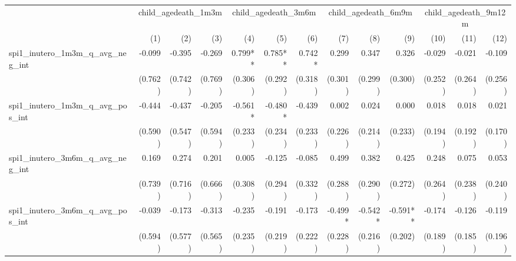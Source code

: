 \begin{tabular}{lrrrrrrrrrrrr}
\toprule
                                            &  \multicolumn{3}{c}{child\_agedeath\_1m3m} &  \multicolumn{3}{c}{child\_agedeath\_3m6m} &  \multicolumn{3}{c}{child\_agedeath\_6m9m} & \multicolumn{3}{c}{child\_agedeath\_9m12m} \\ 
\cmidrule(lr){2-4} \cmidrule(lr){5-7} \cmidrule(lr){8-10} \cmidrule(lr){11-13} 
                                            &          (1) &          (2) &          (3) &          (4) &          (5) &          (6) &          (7) &          (8) &          (9) &         (10) &         (11) &         (12) \\ 
\midrule
spi1\_inutero\_1m3m\_q\_avg\_neg\_int       &       -0.099 &       -0.395 &       -0.269 &      0.799** &      0.785** &       0.742* &        0.299 &        0.347 &        0.326 &       -0.029 &       -0.021 &       -0.109 \\ 
                                            &      (0.762) &      (0.742) &      (0.769) &      (0.306) &      (0.292) &      (0.318) &      (0.301) &      (0.299) &      (0.300) &      (0.252) &      (0.264) &      (0.256) \\ 
spi1\_inutero\_1m3m\_q\_avg\_pos\_int       &       -0.444 &       -0.437 &       -0.205 &      -0.561* &      -0.480* &       -0.439 &        0.002 &        0.024 &        0.000 &        0.018 &        0.018 &        0.021 \\ 
                                            &      (0.590) &      (0.547) &      (0.594) &      (0.233) &      (0.234) &      (0.233) &      (0.226) &      (0.214) &      (0.233) &      (0.194) &      (0.192) &      (0.170) \\ 
spi1\_inutero\_3m6m\_q\_avg\_neg\_int       &        0.169 &        0.274 &        0.201 &        0.005 &       -0.125 &       -0.085 &        0.499 &        0.382 &        0.425 &        0.248 &        0.075 &        0.053 \\ 
                                            &      (0.739) &      (0.716) &      (0.666) &      (0.308) &      (0.294) &      (0.332) &      (0.288) &      (0.290) &      (0.272) &      (0.264) &      (0.238) &      (0.240) \\ 
spi1\_inutero\_3m6m\_q\_avg\_pos\_int       &       -0.039 &       -0.173 &       -0.313 &       -0.235 &       -0.191 &       -0.173 &      -0.499* &      -0.542* &     -0.591** &       -0.174 &       -0.126 &       -0.119 \\ 
                                            &      (0.594) &      (0.577) &      (0.565) &      (0.235) &      (0.219) &      (0.222) &      (0.228) &      (0.216) &      (0.202) &      (0.189) &      (0.185) &      (0.196) \\ 

\end{tabular}
